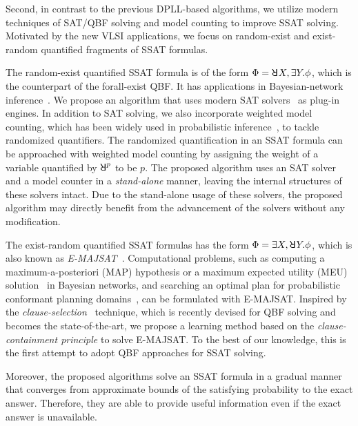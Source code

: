 Second, in contrast to the previous DPLL-based algorithms,
we utilize modern techniques of SAT/QBF solving and model counting to improve SSAT solving.
Motivated by the new VLSI applications,
we focus on random-exist and exist-random quantified fragments of SSAT formulas.

The random-exist quantified SSAT formula is of the form $\Qf=\random{}X,\exists Y.\pf$,
which is the counterpart of the forall-exist QBF.
It has applications in Bayesian-network inference~\cite{Cooper1990,Bacchus2003}.
We propose an algorithm that uses modern SAT solvers~\cite{Een2003Solver,Een2003Incremental} as plug-in engines.
In addition to SAT solving,
we also incorporate weighted model counting,
which has been widely used in probabilistic inference~\cite{Sang2005BayesianInference,Chavira2008},
to tackle randomized quantifiers.
The randomized quantification in an SSAT formula can be approached with weighted model counting
by assigning the weight of a variable quantified by $\random{p}$ to be $p$.
The proposed algorithm uses an SAT solver and a model counter in a \textit{stand-alone} manner,
leaving the internal structures of these solvers intact.
Due to the stand-alone usage of these solvers,
the proposed algorithm may directly benefit from the advancement of the solvers without any modification.

The exist-random quantified SSAT formulas has the form $\Qf=\exists X,\random{}Y.\pf$,
which is also known as \textit{E-MAJSAT}~\cite{Littman1998}.
Computational problems, such as computing a maximum-a-posteriori (MAP) hypothesis or
a maximum expected utility (MEU) solution~\cite{Dechter1998} in Bayesian networks,
and searching an optimal plan for probabilistic conformant planning domains~\cite{Littman1998},
can be formulated with E-MAJSAT.
Inspired by the \textit{clause-selection}~\cite{Janota2015,Rabe2015} technique,
which is recently devised for QBF solving and becomes the state-of-the-art,
we propose a learning method based on the \textit{clause-containment principle} to solve E-MAJSAT.
To the best of our knowledge,
this is the first attempt to adopt QBF approaches for SSAT solving.

Moreover, the proposed algorithms solve an SSAT formula in a gradual manner
that converges from approximate bounds of the satisfying probability to the exact answer.
Therefore, they are able to provide useful information even if the exact answer is unavailable.


